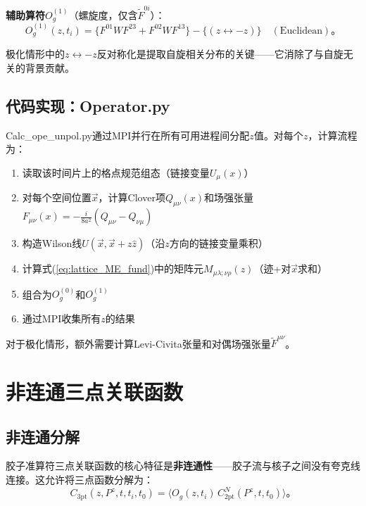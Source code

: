 \documentclass[12pt,a4paper]{ctexart}
\theoremstyle{definition}
\begin{document}
\textbf{辅助算符$O^{(1)}_g$}（螺旋度，仅含$\tilde{F}^{0i}$）：
\begin{equation}
O^{(1)}_g(z, t_i) = \big\{F^{01}W F^{23} + F^{02}W F^{13}\big\} - \big\{ (z \leftrightarrow -z) \big\} \quad (\text{Euclidean})。
\label{eq:pol_Og1}
\end{equation}

极化情形中的$z\leftrightarrow -z$反对称化是提取自旋相关分布的关键——它消除了与自旋无关的背景贡献\cite{Egerer2022}。

\subsection{代码实现：Operator.py}

Calc\_ope\_unpol.py通过MPI并行在所有可用进程间分配$z$值\cite{代码解析}。对每个$z$，计算流程为：
\begin{enumerate}
    \item 读取该时间片上的格点规范组态（链接变量$U_\mu(x)$）
    \item 对每个空间位置$\vec{x}$，计算Clover项$Q_{\mu\nu}(x)$和场强张量$F_{\mu\nu}(x)=-\frac{i}{8a^2}(Q_{\mu\nu}-Q_{\nu\mu})$
    \item 构造Wilson线$U(\vec{x},\vec{x}+z\hat{z})$（沿$z$方向的链接变量乘积）
    \item 计算式(\ref{eq:lattice_ME_fund})中的矩阵元$M_{\mu\lambda;\nu\rho}(z)$（迹+对$\vec{x}$求和）
    \item 组合为$O^{(0)}_g$和$O^{(1)}_g$
    \item 通过MPI收集所有$z$的结果
\end{enumerate}

对于极化情形，额外需要计算Levi-Civita张量和对偶场强张量$\tilde{F}^{\mu\nu}$。

\section{非连通三点关联函数}

\subsection{非连通分解}

胶子准算符三点关联函数的核心特征是\textbf{非连通性}\cite{NoteGluonPDFs,Chen2025gluon}——胶子流与核子之间没有夸克线连接。这允许将三点函数分解为：
\begin{equation}
C_{3\text{pt}}(z, P^z, t, t_i, t_0) = \langle O_g(z, t_i) \, C^N_{2\text{pt}}(P^z, t, t_0) \rangle。
\label{eq:3pt_disconnected}
\end{equation}
\end{document}
